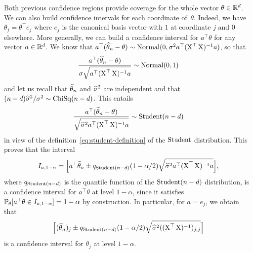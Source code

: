 Both previous confidence regions provide coverage for the whole vector $\theta \in \R^d$.
We can also build confidence intervals for each coordinate of~$\theta$.
Indeed, we have $\theta_j = \theta^\top e_j$ where $e_j$ is the canonical basis vector with $1$ at coordinate $j$ and $0$ elsewhere. 
More generally, we can build a confidence interval for $a^\top \theta$ for any vector $a \in \R^d$.
We know that $a^\top(\wh \theta_n - \theta) \sim \nor(0, \sigma^2 a^\top (\bX^\top \bX)^{-1} a)$, so that
\begin{equation*}
	\frac{a^\top(\wh \theta_n - \theta)}{\sigma \sqrt{a^\top (\bX^\top \bX)^{-1} a}} \sim \nor(0, 1)
\end{equation*}
and let us recall that $\wh \theta_n$ and $\wh \sigma^2$ are independent and that $(n - d) \wh \sigma^2 / \sigma^2 \sim \chisq(n - d)$.
This entails
\begin{equation}
	\label{eq:ci-construction-gaussian-linear-model}
	\frac{a^\top(\wh \theta_n - \theta)}{\sqrt{\wh \sigma^2 a^\top (\bX^\top \bX)^{-1} a}} 
	\sim \stu(n - d)
\end{equation}
in view of the definition~\eqref{eq:student-definition} of the $\stu$ distribution.%
This proves that the interval
\begin{equation*}
	I_{a, 1 - \alpha} = \Big[a^\top \wh \theta_n \pm q_{\stu(n-d)}(1 - \alpha/2) 
	\sqrt{\wh \sigma^2 a^\top (\bX^\top \bX)^{-1} a} \Big],
\end{equation*}
where $q_{\stu(n-d)}$ is the quantile function of the $\stu(n-d)$ distribution,
is a confidence interval for $a^\top \theta$ at level $1 - \alpha$, since it satisfies $\P_\theta[ a^\top \theta \in I_{a, 1 - \alpha}] = 1 - \alpha$ by construction.%
In particular, for $a = e_j$, we obtain that
\begin{equation}
	\label{eq:ci-gaussian-linear-coordinate}
	\Big[  (\wh \theta_n)_j \pm q_{\stu(n-d)}(1 - \alpha/2) \sqrt{\wh \sigma^2 ((\bX^\top \bX)^{-1})_{j, j}} \Big]
\end{equation}
is a confidence interval for $\theta_j$ at level $1 - \alpha$.

